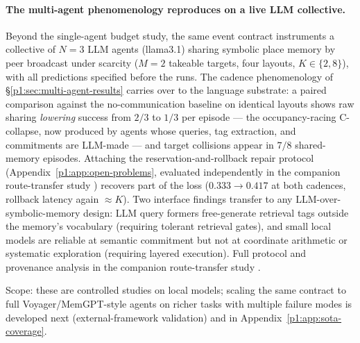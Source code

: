 \documentclass{article}
\begin{document}
\paragraph{The multi-agent phenomenology reproduces on a live LLM collective.}
Beyond the single-agent budget study, the same event contract
instruments a collective of $N{=}3$ LLM agents (llama3.1) sharing
symbolic place memory by peer broadcast under scarcity ($M{=}2$
takeable targets, four layouts, $K\in\{2,8\}$), with all predictions
specified before the runs. The cadence phenomenology of
\S\ref{p1:sec:multi-agent-results} carries over to the language
substrate: a paired comparison against the no-communication baseline
on identical layouts shows raw sharing \emph{lowering} success from
$2/3$ to $1/3$ per episode --- the occupancy-racing C-collapse, now
produced by agents whose queries, tag extraction, and commitments are
LLM-made --- and target collisions appear in $7/8$ shared-memory
episodes. Attaching the reservation-and-rollback repair protocol
(Appendix~\ref{p1:app:open-problems}, evaluated independently in the
companion route-transfer study \citep{songlines2}) recovers part of the loss
($0.333\to0.417$ at both cadences, rollback latency again
${\approx}K$). Two interface findings transfer to any
LLM-over-symbolic-memory design: LLM query formers free-generate
retrieval tags outside the memory's vocabulary (requiring tolerant
retrieval gates), and small local models are reliable at semantic
commitment but not at coordinate arithmetic or systematic exploration
(requiring layered execution). Full protocol and provenance analysis
in the companion route-transfer study \citep{songlines2}.

Scope: these are controlled studies on local models; scaling the same contract to full Voyager/MemGPT-style agents on richer tasks with multiple failure modes is developed next (external-framework validation) and in Appendix~\ref{p1:app:sota-coverage}.
\end{document}
